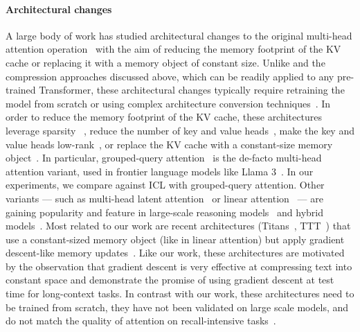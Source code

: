 \paragraph{Architectural changes} A large body of work has studied architectural changes to the original multi-head attention operation~\cite{vaswani2017attention} with the aim of reducing the memory footprint of the KV cache or replacing it with a memory object of constant size.
Unlike \method and the compression approaches discussed above, which can be readily applied to any pre-trained Transformer, these architectural changes typically require retraining the model from scratch or using complex architecture conversion techniques~\cite{zhang2024lolcats}.
In order to reduce the memory footprint of the KV cache, these architectures leverage sparsity ~\cite{beltagy2020longformer,child2019generating,zaheer2020big, team2024gemma}, reduce the number of key and value heads~\cite{shazeer2019fast, ainslie2023gqa}, make the key and value heads low-rank~\cite{liu2024deepseek}, or replace the KV cache with a constant-size memory object~\cite{ zhang2025tensor, arora2024simple,gu2023mamba,yang2024fla,yang2024gla}.
In particular, grouped-query attention~\cite{ainslie2023gqa} is the de-facto multi-head attention variant, used in frontier language models like Llama 3~\cite{dubey2024llama3}. In our experiments, we compare against ICL with grouped-query attention.
Other variants --- such as multi-head latent attention~\cite{liu2024deepseek} or linear attention~\cite{arora2024simple,gu2023mamba} --- are gaining popularity and feature in large-scale reasoning models~\cite{guo2025deepseek} and hybrid models~\cite{li2025minimax,blakeman2025nemotron,team2024jamba}.
Most related to our work are recent architectures (\eg Titans~\cite{behrouz2024titans}, TTT~\cite{sun2024learning}) that use a constant-sized memory object (like in linear attention) but apply gradient descent-like memory updates~\cite{sun2024learning,yang2025parallelizinglineartransformersdelta,behrouz2025atlas,behrouz2024titans,behrouz2025s}.
Like our work, these architectures are motivated by the observation that gradient descent is very effective at compressing text into constant space and demonstrate the promise of using gradient descent at test time for long-context tasks.
In contrast with our work, these architectures need to be trained from scratch, they have not been validated on large scale models, and do not match the quality of attention on recall-intensive tasks~\cite{arora2024simple,behrouz2025atlas}.
\ifx\conference\arxivconf

\fi


